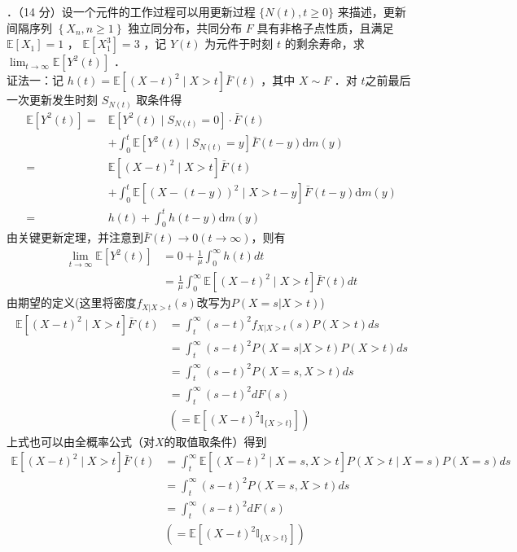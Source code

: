 \documentclass[UTF8]{ctexart}
\begin{document}
．（14 分）设一个元件的工作过程可以用更新过程 $\{N(t), t \geq 0\}$ 来描述，更新间隔序列 $\left\{X_{n}, n \geq 1\right\}$ 独立同分布，共同分布 $F$ 具有非格子点性质，且满足 $\mathbb{E}\left[X_{1}\right]=1$ ， $\mathbb{E}\left[X_{1}^{3}\right]=3$ ，记 $Y(t)$ 为元件于时刻 $t$ 的剩余寿命，求 $\lim _{t \rightarrow \infty} {\mathbb{E}}\left[Y^{2}(t)\right]$ ．\\
证法一：记 $h(t)=\mathbb{E}\left[(X-t)^{2}\mid X>t\right]\bar{F}(t)$ ，其中 $X \sim F$ ．对 $t$之前最后一次更新发生时刻 $S_{N(t)}$ 取条件得
$$
\begin{aligned}
	\mathbb{E}\left[Y^{2}(t)\right]= & \mathbb{E}\left[Y^{2}(t) \mid S_{N(t)}=0\right] \cdot \bar{F}(t) \\
	& +\int_{0}^{t} \mathbb{E}\left[Y^{2}(t) \mid S_{N(t)}=y\right] \bar{F}(t-y) \mathrm{d} m(y) \\
	= & \mathbb{E}\left[(X-t)^{2} \mid X>t\right] \bar{F}(t) \\
	& +\int_{0}^{t} \mathbb{E}\left[(X-(t-y))^{2} \mid X>t-y\right] \bar{F}(t-y) \mathrm{d} m(y) \\
	= & h(t)+\int_{0}^{t} h(t-y) \mathrm{d} m(y) 
\end{aligned}
$$
由关键更新定理，并注意到$\bar{F}(t)\rightarrow 0 (t\rightarrow \infty)$，则有
$$
\begin{aligned}
	\lim _{t \rightarrow \infty} {\mathbb{E}}\left[Y^{2}(t)\right]&=0+\frac{1}{\mu}\int_{0}^{\infty}h(t)dt\\
	&=\frac{1}{\mu}\int_{0}^{\infty} \mathbb{E}\left[(X-t)^2\mid X >t\right]\bar{F}(t)dt 
\end{aligned}
$$
由期望的定义(这里将密度$f_{X|X>t}(s)$改写为$P(X=s|X>t)$)
\begin{align*}
	\mathbb{E}\left[(X-t)^2\mid X >t\right]\bar{F}(t) &
	=\int_{t}^{\infty} (s-t)^2 f_{X|X>t}(s)P(X>t)ds  \\ &=\int_{t}^{\infty} (s-t)^2 P(X=s|X>t)P(X>t)ds  \\
	& = \int_{t}^{\infty} (s-t)^2 P(X=s , X>t)ds  \\
	& = \int_{t}^{\infty}  (s-t)^2 dF(s)\\
	&\left( =\mathbb{E}\left[(X-t)^2 \mathbb{I}_{\{X >t\}}\right]\right) 
\end{align*}
上式也可以由全概率公式（对$X$的取值取条件）得到
\begin{align*}
	\mathbb{E}\left[(X-t)^2\mid X >t\right]\bar{F}(t) & =\int_{t}^{\infty} \mathbb{E}\left[(X-t)^2 \mid X=s,X>t \right] P(X>t \mid X=s)P(X=s)ds  \\
    & = \int_{t}^{\infty} (s-t)^2 P(X=s , X>t)ds  \\
    & = \int_{t}^{\infty}  (s-t)^2 dF(s)\\
    &\left( =\mathbb{E}\left[(X-t)^2 \mathbb{I}_{\{X >t\}}\right]\right) 
\end{align*}
\end{document}
